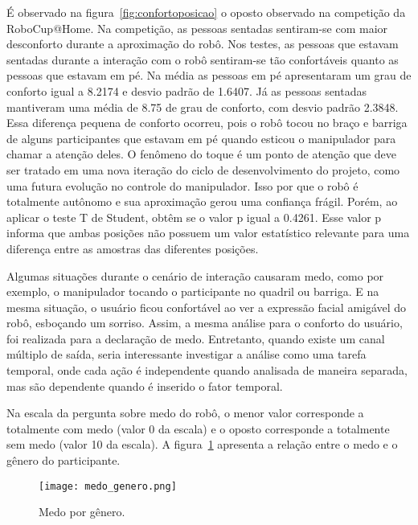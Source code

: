 É observado na figura~\ref{fig:confortoposicao} o oposto observado na competição da RoboCup@Home. Na competição, as pessoas sentadas sentiram-se com maior desconforto durante a aproximação do robô. Nos testes, as pessoas que estavam sentadas durante a interação com o robô sentiram-se tão confortáveis quanto as pessoas que estavam em pé. Na média as pessoas em pé apresentaram um grau de conforto igual a 8.2174 e desvio padrão de 1.6407. Já as pessoas sentadas mantiveram uma média de 8.75 de grau de conforto, com desvio padrão 2.3848. Essa diferença pequena de conforto ocorreu, pois o robô tocou no braço e barriga de alguns participantes que estavam em pé quando esticou o manipulador para chamar a atenção deles. O fenômeno do toque é um ponto de atenção que deve ser tratado em uma nova iteração do ciclo de desenvolvimento do projeto, como uma futura evolução no controle do manipulador. Isso por que o robô é totalmente autônomo e sua aproximação gerou uma confiança frágil. Porém, ao aplicar o teste T de Student, obtêm se o valor p igual a 0.4261. Esse valor p informa que ambas posições não possuem um valor estatístico relevante para uma diferença entre as amostras das diferentes posições. 

Algumas situações durante o cenário de interação causaram medo, como por exemplo, o manipulador tocando o participante no quadril ou barriga. E na mesma situação, o usuário ficou confortável ao ver a expressão facial amigável do robô, esboçando um sorriso. Assim, a mesma análise para o conforto do usuário, foi realizada para a declaração de medo. Entretanto, quando existe um canal múltiplo de saída, seria interessante investigar a análise como uma tarefa temporal, onde cada ação é independente quando analisada de maneira separada, mas são dependente quando é inserido o fator temporal. 

Na escala da pergunta sobre medo do robô, o menor valor corresponde a totalmente com medo (valor 0 da escala) e o oposto corresponde a totalmente sem medo (valor 10 da escala). A figura~\ref{fig:medogenero} apresenta a relação entre o medo e o gênero do participante.

\begin{figure}[ht!]
	\centering
	\begin{minipage}{0.65\textwidth}
		\caption{Medo por gênero.}
		\texttt{[image: medo\_genero.png]}
		\label{fig:medogenero}
	\end{minipage}
\end{figure}

